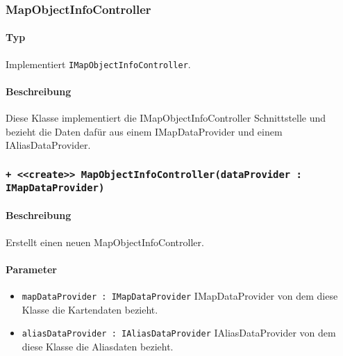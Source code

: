 \subsubsection{MapObjectInfoController}\label{App_Map_ViewModel_MapObjectInfoController}
\paragraph*{Typ}
Implementiert \texttt{IMapObjectInfoController}.
\paragraph*{Beschreibung}
Diese Klasse implementiert die IMapObjectInfoController Schnittstelle und bezieht die Daten 
dafür aus einem IMapDataProvider und einem IAliasDataProvider.

\subsubsection*{\texttt{+ <<create>> MapObjectInfoController(dataProvider : IMapDataProvider)}}\label{App_Map_ViewModel_createMapObjectInfoController}%
\paragraph*{Beschreibung}
Erstellt einen neuen MapObjectInfoController.
\paragraph*{Parameter}
\begin{itemize}
    \item \texttt{mapDataProvider : IMapDataProvider} IMapDataProvider von dem diese Klasse die Kartendaten bezieht.
    \item \texttt{aliasDataProvider : IAliasDataProvider} IAliasDataProvider von dem diese Klasse die Aliasdaten bezieht.
\end{itemize}
